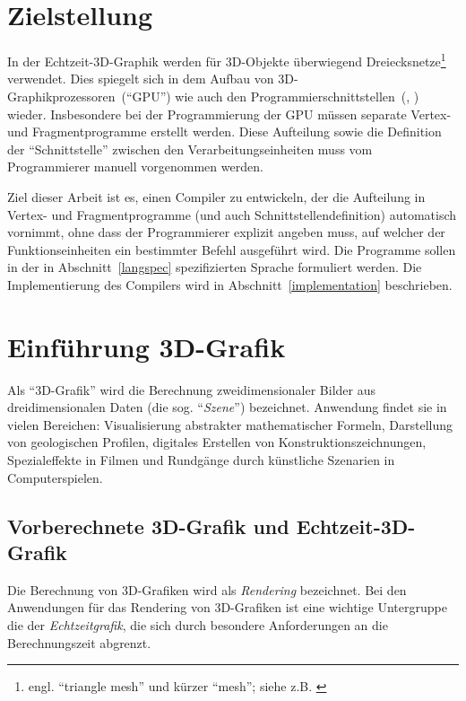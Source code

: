 \documentclass[twoside,a4paper,fleqn,12pt]{book}
\begin{document}
\chapter{Zielstellung}

In der Echtzeit-3D-Graphik werden für 3D-Objekte überwiegend Dreiecksnetze\footnote{engl. ``triangle mesh'' und kürzer ``mesh''; siehe z.B. \cite{watt_de}}
verwendet. Dies spiegelt sich in dem Aufbau von 3D-Graphikprozessoren~("`GPU"') wie auch
den Programmierschnittstellen~(\cite{glspec4}, \cite{dx10}) wieder. Insbesondere bei der Programmierung der GPU müssen
separate Vertex- und Fragmentprogramme %
erstellt werden. Diese Aufteilung sowie die Definition der "`Schnittstelle"' zwischen den Verarbeitungseinheiten muss vom Programmierer manuell vorgenommen werden.

Ziel dieser Arbeit ist es, einen Compiler zu entwickeln, der die Aufteilung in Vertex- und Fragmentprogramme (und auch Schnittstellendefinition)
automatisch vornimmt,
ohne dass der Programmierer explizit angeben muss, auf welcher der Funktionseinheiten ein bestimmter Befehl ausgeführt wird.
Die Programme sollen in der in Abschnitt~\ref{langspec} spezifizierten Sprache formuliert werden.
Die Implementierung des Compilers wird in Abschnitt~\ref{implementation} beschrieben.


\chapter{Einführung 3D-Grafik}

Als "`3D-Grafik"' wird die Berechnung zweidimensionaler Bilder aus dreidimensionalen Daten (die sog. "`\emph{Szene}"')
 bezeichnet.
Anwendung findet sie in vielen Bereichen: Visualisierung abstrakter mathematischer Formeln, Darstellung
von geologischen Profilen, digitales Erstellen von Konstruktionszeichnungen, Spezialeffekte in Filmen und
Rundgänge durch künstliche Szenarien in Computerspielen. 

\section{Vorberechnete 3D-Grafik und Echtzeit-3D-Grafik}

Die Berechnung von 3D-Grafiken wird als \emph{Rendering} bezeichnet. Bei den Anwendungen für das Rendering
von 3D-Grafiken ist eine wichtige Untergruppe die der \emph{Echtzeitgrafik}, die sich durch besondere Anforderungen
an die Berechnungszeit abgrenzt.
\end{document}
